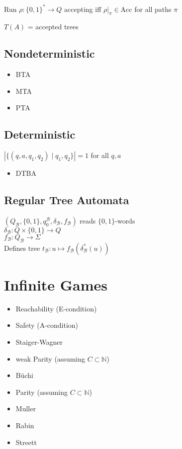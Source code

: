 \documentclass{article}
\begin{document}
Run $\rho : \{0,1\}^* \rightarrow Q$ accepting iff $\rho \vert_\pi \in \text{Acc}$ for all paths $\pi$

$T(A)$ = accepted trees

\subsection{Nondeterministic}
\begin{itemize}
	\item BTA
	\item MTA
	\item PTA
\end{itemize}

\subsection{Deterministic}
$| \{ (q, a, q_1, q_2) \mid q_1, q_2 \} | = 1$ for all $q, a$

\begin{itemize}
	\item DTBA
\end{itemize}

\subsection{Regular Tree Automata}
$(Q_\mathcal{B}, \{0, 1\}, q_0^\mathcal{B}, \delta_\mathcal{B}, f_\mathcal{B})$ reads $\{0,1\}$-words \\
$\delta_\mathcal{B} : Q \times \{0, 1\} \rightarrow Q$ \\
$f_\mathcal{B} : Q_\mathcal{B} \rightarrow \Sigma$ \\

Defines tree $t_\mathcal{B} : u \mapsto f_\mathcal{B}(\delta^*_\mathcal{B}(u))$



\newpage
\section{Infinite Games}
\begin{itemize}
	\item Reachability (E-condition)
	\item Safety (A-condition)
	\item Staiger-Wagner
	\item weak Parity (assuming $C \subset \mathbb{N}$)
	\item Büchi
	\item Parity (assuming $C \subset \mathbb{N}$)
	\item Muller
	\item Rabin
	\item Streett 
\end{itemize}
\end{document}
